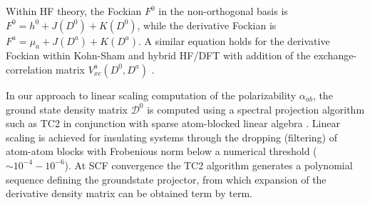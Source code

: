 \documentclass[prl,aps,twocolumn,showpacs,twocolumngrid,superbib]{revtex4}
\begin{document}
Within HF theory, the Fockian $F^0$ in the non-orthogonal basis is $F^0=h^0+J(D^0)+K(D^0)$, while 
the derivative Fockian is $F^a=\mu_a+J(D^a)+K(D^a)$.  A similar equation holds for the derivative Fockian 
within Kohn-Sham and hybrid HF/DFT with addition of the exchange-correlation 
matrix $V_{xc}^a(D^0,D^a)$ \cite{Lee_1994}.

In our approach to linear scaling computation of the polarizability $\alpha_{ab}$, the ground state 
density matrix $\mathcal{D}^0$ is computed using a spectral projection algorithm such 
as TC2 \cite{ANiklasson02A} in conjunction with sparse atom-blocked linear algebra \cite{ANiklasson03,MChallacombe00B}.  
Linear scaling is achieved for insulating systems through the dropping (filtering) of atom-atom 
blocks with Frobenious norm below a numerical threshold ($\sim 10^{-4}-10^{-6}$).
At SCF convergence the TC2 algorithm generates a polynomial sequence defining the groundstate projector, 
from which expansion of the derivative density matrix can be obtained term by term.
\end{document}
